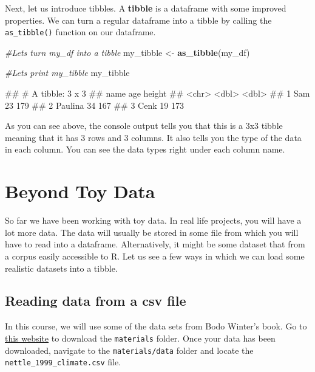 \documentclass[
]{book}
\newenvironment{Shaded}{\begin{snugshade}}{\end{snugshade}}
\newcommand{\CommentTok}[1]{\textcolor[rgb]{0.56,0.35,0.01}{\textit{#1}}}
\newcommand{\FunctionTok}[1]{\textcolor[rgb]{0.13,0.29,0.53}{\textbf{#1}}}
\newcommand{\NormalTok}[1]{#1}
\newcommand{\OtherTok}[1]{\textcolor[rgb]{0.56,0.35,0.01}{#1}}
\begin{document}
Next, let us introduce tibbles. A \textbf{tibble} is a dataframe with some improved properties. We can turn a regular dataframe into a tibble by calling the \texttt{as\_tibble()} function on our dataframe.

\begin{Shaded}
\begin{Highlighting}[]
\CommentTok{\#Let\textquotesingle{}s turn my\_df into a tibble}
\NormalTok{my\_tibble }\OtherTok{\textless{}{-}} \FunctionTok{as\_tibble}\NormalTok{(my\_df)}

\CommentTok{\#Let\textquotesingle{}s print my\_tibble}
\NormalTok{my\_tibble}
\end{Highlighting}
\end{Shaded}

\begin{Shaded}
\begin{Highlighting}[]
\NormalTok{\#\# \# A tibble: 3 x 3}
\NormalTok{\#\#   name      age height}
\NormalTok{\#\#   \textless{}chr\textgreater{}   \textless{}dbl\textgreater{}  \textless{}dbl\textgreater{}}
\NormalTok{\#\# 1 Sam        23    179}
\NormalTok{\#\# 2 Paulina    34    167}
\NormalTok{\#\# 3 Cenk       19    173}
\end{Highlighting}
\end{Shaded}

As you can see above, the console output tells you that this is a 3x3 tibble meaning that it has 3 rows and 3 columns. It also tells you the type of the data in each column. You can see the data types right under each column name.

\section{Beyond Toy Data}\label{beyond-toy-data}

So far we have been working with toy data. In real life projects, you will have a lot more data. The data will usually be stored in some file from which you will have to read into a dataframe. Alternatively, it might be some dataset that from a corpus easily accessible to R. Let us see a few ways in which we can load some realistic datasets into a tibble.

\subsection{Reading data from a csv file}\label{reading-data-from-a-csv-file}

In this course, we will use some of the data sets from Bodo Winter's book. Go to \href{https://osf.io/34mq9/}{this website} to download the \texttt{materials} folder. Once your data has been downloaded, navigate to the \texttt{materials/data} folder and locate the \texttt{nettle\_1999\_climate.csv} file.
\end{document}
